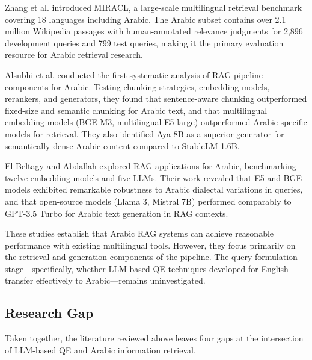 Zhang et al. \cite{zhang_2023_miracl} introduced MIRACL, a large-scale multilingual retrieval benchmark covering 18 languages including Arabic. The Arabic subset contains over 2.1 million Wikipedia passages with human-annotated relevance judgments for 2,896 development queries and 799 test queries, making it the primary evaluation resource for Arabic retrieval research.

Alsubhi et al. \cite{alsubhi_2025_optimizing} conducted the first systematic analysis of RAG pipeline components for Arabic. Testing chunking strategies, embedding models, rerankers, and generators, they found that sentence-aware chunking outperformed fixed-size and semantic chunking for Arabic text, and that multilingual embedding models (BGE-M3, multilingual E5-large) outperformed Arabic-specific models for retrieval. They also identified Aya-8B as a superior generator for semantically dense Arabic content compared to StableLM-1.6B.

El-Beltagy and Abdallah \cite{elbeltagysamhaar_2024_exploring} explored RAG applications for Arabic, benchmarking twelve embedding models and five LLMs. Their work revealed that E5 and BGE models exhibited remarkable robustness to Arabic dialectal variations in queries, and that open-source models (Llama 3, Mistral 7B) performed comparably to GPT-3.5 Turbo for Arabic text generation in RAG contexts.

These studies establish that Arabic RAG systems can achieve reasonable performance with existing multilingual tools. However, they focus primarily on the retrieval and generation components of the pipeline. The query formulation stage---specifically, whether LLM-based QE techniques developed for English transfer effectively to Arabic---remains uninvestigated.

\subsection{Research Gap}
\label{sec:research_gap}

Taken together, the literature reviewed above leaves four gaps at the intersection of LLM-based QE and Arabic information retrieval.

